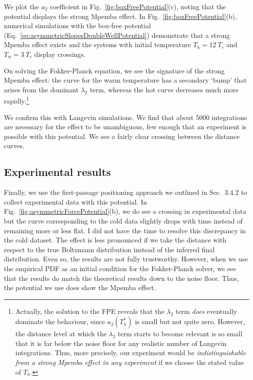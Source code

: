 \documentclass[hyperref={colorlinks=true, urlcolor=blue, citecolor=blue, final, bound}]{sfuthesis}
\begin{document}
We plot the $a_2$ coefficient in Fig.~\ref{fig:boxFreePotential}(c), noting that the potential displays the strong Mpemba effect. In Fig.~\ref{fig:boxFreePotential}(b), numerical simulations with the box-free potential (Eq.~\ref{eq:asymmetricSlopesDoubleWellPotential}) demonstrate that a strong Mpemba effect exists and the systems with initial temperature $T_h=12~T_c$ and $T_w=3~T_c$ display crossings.

On solving the Fokker-Planck equation, we see the signature of the strong Mpemba effect: the curve for the warm temperature has a secondary `bump' that arises from the dominant $\lambda_2$ term, whereas the hot curve decreases much more rapidly.\footnote{Actually, the solution to the FPE reveals that the $\lambda_2$ term \textit{does} eventually dominate the behaviour, since $a_2(T_h^*)$ is small but not quite zero. However, the distance level at which the $\lambda_2$ term starts to become relevant is so small that it is far below the noise floor for any realistic number of Langevin integrations. Thus, more precisely, our experiment would be \textit{indistinguishable from a strong Mpemba effect in any experiment} if we choose the stated value of $T_h$.}

We confirm this with Langevin simulations. We find that about \num{5000} integrations are necessary for the effect to be unambiguous, few enough that an experiment is possible with this potential. We see a fairly clear crossing between the distance curves.

\subsection{Experimental results}
Finally, we use the first-passage positioning approach we outlined in Sec.~3.4.2 to collect experimental data with this potential. In Fig.~\ref{fig:asymmetricForcePotential}(b), we do see a crossing in experimental data but the curve corresponding to the cold data slightly drops with time instead of remaining more or less flat. I did not have the time to resolve this discrepancy in the cold dataset. The effect is less pronounced if we take the distance with respect to the true Boltzmann distribution instead of the inferred final distribution. Even so, the results are not fully trustworthy. However, when we use the empirical PDF as an initial condition for the Fokker-Planck solver, we see that the results do match the theoretical results down to the noise floor. Thus, the potential we use does show the Mpemba effect.
\end{document}
